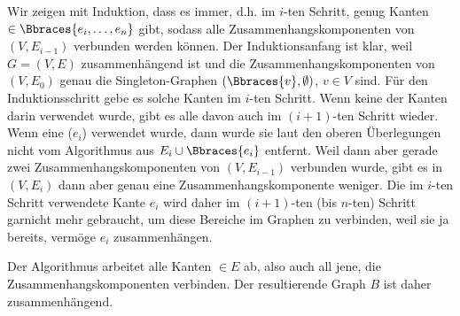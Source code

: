 \begin{solution}
\begin{enumerate}[label = (\Alph*)]
    Wir zeigen mit Induktion, dass es immer, d.h. im $i$-ten Schritt, genug Kanten $\in \Bbraces{e_i, \dots, e_n}$ gibt, sodass alle Zusammenhangskomponenten von $(V, E_{i-1})$ verbunden werden können.
    Der Induktionsanfang ist klar, weil $G = (V, E)$ zusammenhängend ist und die Zusammenhangskomponenten von $(V, E_0)$ genau die Singleton-Graphen $(\Bbraces{v}, \emptyset)$, $v \in V$ sind.
    Für den Induktionsschritt gebe es solche Kanten im $i$-ten Schritt.
    Wenn keine der Kanten darin verwendet wurde, gibt es alle davon auch im $(i+1)$-ten Schritt wieder.
    Wenn eine ($e_i$) verwendet wurde, dann wurde sie laut den oberen Überlegungen nicht vom Algorithmus aus $E_i \cup \Bbraces{e_i}$ entfernt.
    Weil dann aber gerade zwei Zusammenhangskomponenten von $(V, E_{i-1})$ verbunden wurde, gibt es in $(V, E_i)$ dann aber genau eine Zusammenhangskomponente weniger.
    Die im $i$-ten Schritt verwendete Kante $e_i$ wird daher im $(i+1)$-ten (bis $n$-ten) Schritt garnicht mehr gebraucht, um diese Bereiche im Graphen zu verbinden, weil sie ja bereits, vermöge $e_i$ zusammenhängen.

    Der Algorithmus arbeitet alle Kanten $\in E$ ab, also auch all jene, die Zusammenhangskomponenten verbinden.
    Der resultierende Graph $B$ ist daher zusammenhängend.

\end{enumerate}

\end{solution}

